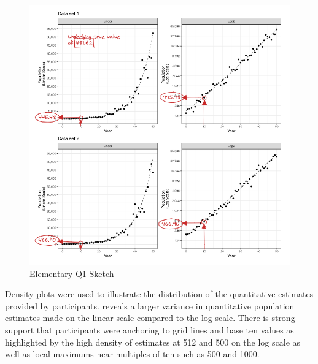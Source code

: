 \documentclass[print]{nuthesis}
\begin{document}
\begin{figure}[tbp]

{\centering \includegraphics[width=1\linewidth,]{images/03-estimation/qe1-sketch} 

}

\caption{Elementary Q1 Sketch}\label{fig:qe1-sketch}
\end{figure}

Density plots were used to illustrate the distribution of the quantitative estimates provided by participants.
 reveals a larger variance in quantitative population estimates made on the linear scale compared to the log scale.
There is strong support that participants were anchoring to grid lines and base ten values as highlighted by the high density of estimates at 512 and 500 on the log scale as well as local maximums near multiples of ten such as 500 and 1000.
\end{document}
